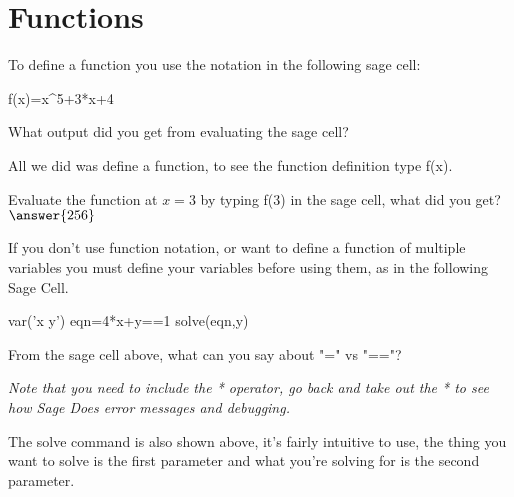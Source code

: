 \documentclass{ximera}
\begin{document}
\section{Functions}
To define a function you use the notation in the following sage cell:
\begin{onlineOnly}
\begin{sageCell}
f(x)=x^5+3*x+4
\end{sageCell}
\end{onlineOnly}
\begin{question}
What output did you get from evaluating the sage cell?
\begin{multipleChoice}
\end{multipleChoice}
\begin{feedback}
All we did was define a function, to see the function definition type f(x).
\end{feedback}
Evaluate the function at $x=3$ by typing f(3) in the sage cell, what did you get? $\answer{256}$
\end{question}
If you don't use function notation, or want to define a function of multiple variables you must define your variables before using them, as in the following Sage Cell.
\begin{onlineOnly}
\begin{sageCell}
var('x y')
eqn=4*x+y==1
solve(eqn,y)
\end{sageCell}
\end{onlineOnly}
\begin{question}
From the sage cell above, what can you say about "=" vs "=="?
\begin{multipleChoice}
\end{multipleChoice}
\begin{feedback}
\textit{Note that you need to include the * operator, go back and take out the * to see how Sage Does error messages and debugging.}
\end{feedback}
\end{question}
The solve command is also shown above, it's fairly intuitive to use, the thing you want to solve is the first parameter and what you're solving for is the second parameter.
\end{document}
